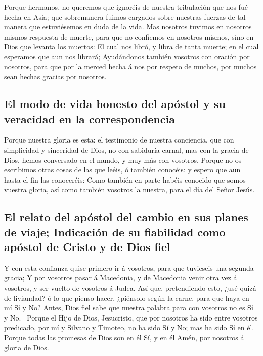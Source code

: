  Porque hermanos, no queremos que ignoréis de nuestra
tribulación que nos fué hecha en Asia; que sobremanera fuimos cargados
sobre nuestras fuerzas de tal manera que estuviésemos en duda de la
vida.  Mas nosotros tuvimos en nosotros mismos respuesta de
muerte, para que no confiemos en nosotros mismos, sino en Dios que
levanta los muertos:  El cual nos libró, y libra de tanta
muerte; en el cual esperamos que aun nos librará; 
Ayudándonos también vosotros con oración por nosotros, para que por la
merced hecha á nos por respeto de muchos, por muchos sean hechas gracias
por nosotros.

\hypertarget{el-modo-de-vida-honesto-del-apuxf3stol-y-su-veracidad-en-la-correspondencia}{%
\subsection{El modo de vida honesto del apóstol y su veracidad en la
correspondencia}\label{el-modo-de-vida-honesto-del-apuxf3stol-y-su-veracidad-en-la-correspondencia}}

 Porque nuestra gloria es esta: el testimonio de nuestra
conciencia, que con simplicidad y sinceridad de Dios, no con sabiduría
carnal, mas con la gracia de Dios, hemos conversado en el mundo, y muy
más con vosotros.  Porque no os escribimos otras cosas de
las que leéis, ó también conocéis: y espero que aun hasta el fin las
conoceréis:  Como también en parte habéis conocido que
somos vuestra gloria, así como también vosotros la nuestra, para el día
del Señor Jesús.

\hypertarget{el-relato-del-apuxf3stol-del-cambio-en-sus-planes-de-viaje-indicaciuxf3n-de-su-fiabilidad-como-apuxf3stol-de-cristo-y-de-dios-fiel}{%
\subsection{El relato del apóstol del cambio en sus planes de viaje;
Indicación de su fiabilidad como apóstol de Cristo y de Dios
fiel}\label{el-relato-del-apuxf3stol-del-cambio-en-sus-planes-de-viaje-indicaciuxf3n-de-su-fiabilidad-como-apuxf3stol-de-cristo-y-de-dios-fiel}}

 Y con esta confianza quise primero ir á vosotros, para que
tuvieseis una segunda gracia;  Y por vosotros pasar á
Macedonia, y de Macedonia venir otra vez á vosotros, y ser vuelto de
vosotros á Judea.  Así que, pretendiendo esto, ¿usé quizá
de liviandad? ó lo que pienso hacer, ¿piénsolo según la carne, para que
haya en mí Sí y No?  Antes, Dios fiel sabe que nuestra
palabra para con vosotros no es Sí y No.~ Porque el Hijo de
Dios, Jesucristo, que por nosotros ha sido entre vosotros predicado, por
mí y Silvano y Timoteo, no ha sido Sí y No; mas ha sido Sí en él.
 Porque todas las promesas de Dios son en él Sí, y en él
Amén, por nosotros á gloria de Dios.

